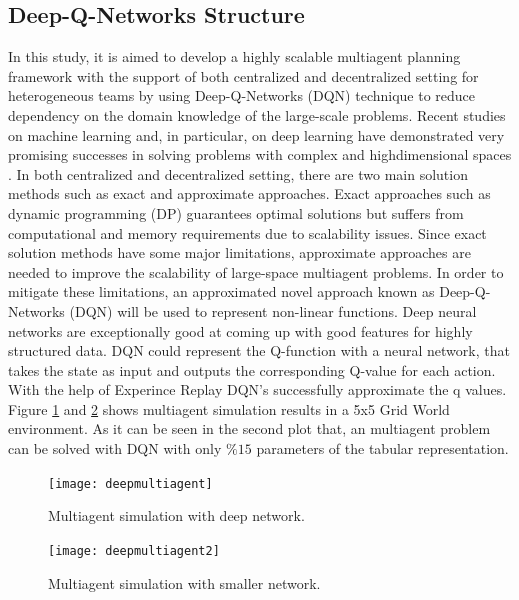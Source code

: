 \documentclass{ituphdreport}
\begin{document}
\subsection{Deep-Q-Networks Structure} \label{sec:TODO!PAR}
In this study, it is aimed to develop a highly scalable multiagent planning framework with the support of both centralized and decentralized setting for heterogeneous teams by using Deep-Q-Networks (DQN) technique to reduce dependency on the domain knowledge of
the large-scale problems. Recent studies on machine learning and, in particular, on deep learning have demonstrated very promising successes in solving problems with complex and highdimensional spaces \cite{mnih-dqn-2015}. In both centralized and decentralized setting, there are two main solution methods such as exact
and approximate approaches. Exact approaches such as dynamic programming (DP) guarantees
optimal solutions but suffers from computational and memory requirements due to scalability
issues. Since exact solution methods have some major limitations, approximate approaches are
needed to improve the scalability of large-space multiagent problems. In order to mitigate these
limitations, an approximated novel approach known as Deep-Q-Networks (DQN) will be used
to represent non-linear functions. Deep neural networks are exceptionally good at coming up with good features for highly structured data. DQN could represent the Q-function with a neural network, that takes the state as input and outputs the corresponding Q-value for each action. With the help of Experince Replay DQN's successfully approximate the q values. Figure \ref{fig:deepmultiagent} and \ref{fig:deepmultiagent2} shows multiagent simulation results in a 5x5 Grid World environment. As it can be seen in the second plot that, an multiagent problem can be solved with DQN with only $ \%15 $ parameters of the tabular representation.

\begin{figure}[h]
	\begin{center}
		\texttt{[image: deepmultiagent]}
	\end{center}
	\caption{Multiagent simulation with deep network.
		\label{fig:deepmultiagent}}
\end{figure}
\begin{figure}[h]
	\begin{center}
		\texttt{[image: deepmultiagent2]}
	\end{center}
	\caption{Multiagent simulation with smaller network.
		\label{fig:deepmultiagent2}}
\end{figure}
\end{document}
